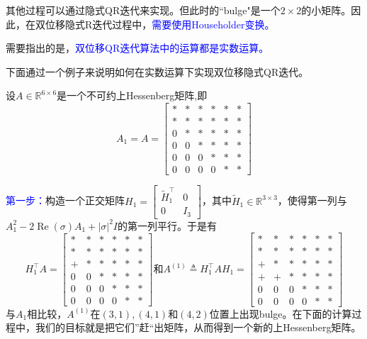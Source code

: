 \documentclass[12pt,a4paper]{article}
\begin{document}
其他过程可以通过隐式QR迭代来实现。但此时的“bulge"是一个$2\times 2$的小矩阵。因此，在双位移隐式R迭代过程中，\textcolor{blue}{需要使用Householder变换。}

需要指出的是，\textcolor{blue}{双位移QR迭代算法中的运算都是实数运算。}

下面通过一个例子来说明如何在实数运算下实现双位移隐式QR迭代。

设$A \in \mathbb{R}^{6 \times 6}$是一个不可约上Hessenberg矩阵,即$$
A_{1}=A=\left[\begin{array}{cccccc}{*} & {*} & {*}  & {*} & {*} & {*}\\ {*} & {*} & {*} & {*} & {*} & {*} \\ {0} & {*} & {*} & {*}  & {*} & {*}\\ {0} & {0} & {*} & {*} & {*} & {*} \\ {0}& {0}  & {0} & {*} & {*}  & {*} \\ {0} & {0} & {0} & {0} & {*} & {*}\end{array}\right]
$$

\textcolor{blue}{第一步：}\quad 构造一个正交矩阵$H_{1}=\left[\begin{array}{cc}{\tilde{H}_{1}^{\top}} & {0} \\ {0} & {I_{3}}\end{array}\right]$，其中$\tilde{H}_{1} \in \mathbb{R}^{3 \times 3}$，使得第一列与$A_{1}^{2}-2 \operatorname{Re}(\sigma) A_{1}+|\sigma|^{2} I$的第一列平行。于是有$$
H_{1}^{\top} A=\left[\begin{array}{cccccc}{*} & {*} & {*} & {*} & {*}& {*}\\ {*} & {*} & {*} & {*}& {*}& {*} \\ {+} & {*} & {*} & {*}& {*}& {*} \\ {0} & {0} & {*} & {*}& {*}& {*} \\ {0} & {0} & {0} & {*} & {*}& {*}\\ {0} & {0} & {0} & {0} & {*}& {*}\end{array}\right]
\text{和}A^{(1)} \triangleq H_{1}^{\top} A H_{1}=\left[\begin{array}{cccccc}{*} & {*} & {*} & {*}& {*}& {*} \\ {*} & {*} & {*} & {*}& {*}& {*} \\ {+} & {*} & {*} & {*}& {*}& {*} \\ {+} & {+} & {*}& {*} & {*} & {*}  \\ {0} & {0} & {0} & {*} & {*}& {*} \\ {0} & {0} & {0} & {0 }& {*}& {*}\end{array}\right]
$$
与$A_1$相比较，$A^{(1)}$在$(3,1),(4,1)$和$(4,2)$位置上出现bulge。在下面的计算过程中，我们的目标就是把它们”赶“出矩阵，从而得到一个新的上Hessenberg矩阵。
\end{document}
